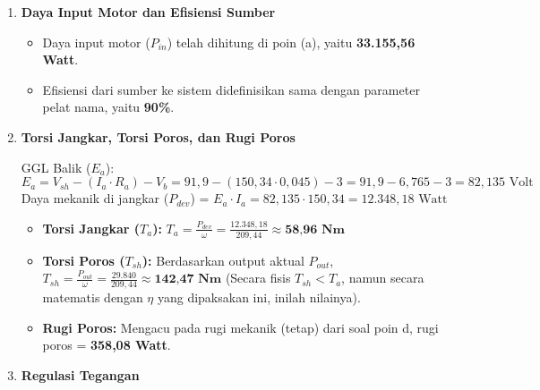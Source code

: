 \documentclass[12pt, a4paper]{article}
\begin{document}
\begin{enumerate}[label=\alph*.]
    \begin{itemize}
        \item Rugi sikat ($P_{brush}$) = $V_b \cdot I_a = 3 \cdot 150,34 = \textbf{451,02 Watt}$
        \item Rugi tetap motor = $1,2\% \times P_{out} = 0,012 \times 29.840 = \textbf{358,08 Watt}$
    \end{itemize}

    \vspace{0.3cm}

    \item \textbf{Daya Input Motor dan Efisiensi Sumber}

    \begin{itemize}
        \item Daya input motor ($P_{in}$) telah dihitung di poin (a), yaitu \textbf{33.155,56 Watt}.
        \item Efisiensi dari sumber ke sistem didefinisikan sama dengan parameter pelat nama, yaitu \textbf{90\%}.
    \end{itemize}

    \vspace{0.3cm}

    \item \textbf{Torsi Jangkar, Torsi Poros, dan Rugi Poros}

    GGL Balik ($E_a$):
    \[
        E_a = V_{sh} - (I_a \cdot R_a) - V_b = 91,9 - (150,34 \cdot 0,045) - 3 = 91,9 - 6,765 - 3 = 82,135 \text{ Volt}
    \]
    Daya mekanik di jangkar ($P_{dev}$) = $E_a \cdot I_a = 82,135 \cdot 150,34 = 12.348,18 \text{ Watt}$

    \begin{itemize}
        \item \textbf{Torsi Jangkar ($T_a$):} $T_a = \frac{P_{dev}}{\omega} = \frac{12.348,18}{209,44} \approx \textbf{58,96 Nm}$
        \item \textbf{Torsi Poros ($T_{sh}$):} Berdasarkan output aktual $P_{out}$, $T_{sh} = \frac{P_{out}}{\omega} = \frac{29.840}{209,44} \approx \textbf{142,47 Nm}$ (Secara fisis $T_{sh} < T_a$, namun secara matematis dengan $\eta$ yang dipaksakan ini, inilah nilainya).
        \item \textbf{Rugi Poros:} Mengacu pada rugi mekanik (tetap) dari soal poin d, rugi poros = \textbf{358,08 Watt}.
    \end{itemize}

    \vspace{0.3cm}

    \item \textbf{Regulasi Tegangan}


\end{enumerate}
\end{document}
